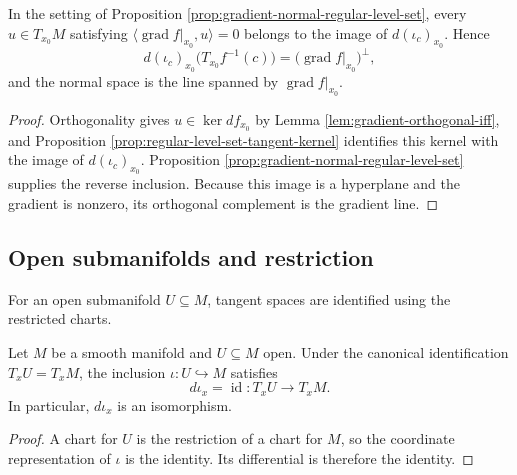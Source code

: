 \begin{proposition}
\label{prop:tangent-space-regular-level-set-gradient-orthogonal}
\leanok
{}
In the setting of Proposition \ref{prop:gradient-normal-regular-level-set}, every
$u\in T_{x_0}M$ satisfying
$\langle\operatorname{grad}f|_{x_0},u\rangle=0$ belongs to the image of
$d(\iota_c)_{x_0}$. Hence
\[
d(\iota_c)_{x_0}\bigl(T_{x_0}f^{-1}(c)\bigr)
=\bigl(\operatorname{grad}f|_{x_0}\bigr)^\perp,
\]
and the normal space is the line spanned by $\operatorname{grad}f|_{x_0}$.
\end{proposition}

\begin{proof}
\leanok
{}
\sketch Orthogonality gives $u\in\ker df_{x_0}$ by
Lemma \ref{lem:gradient-orthogonal-iff}, and Proposition
\ref{prop:regular-level-set-tangent-kernel} identifies this kernel with the image
of $d(\iota_c)_{x_0}$. Proposition
\ref{prop:gradient-normal-regular-level-set} supplies the reverse inclusion.
Because this image is a hyperplane and the gradient is nonzero, its orthogonal
complement is the gradient line.
\end{proof}

\subsection*{Open submanifolds and restriction}

For an open submanifold $U\subseteq M$, tangent spaces are identified using the
restricted charts.

\begin{lemma}
\label{lem:opens-inclusion-differential}
\leanok
Let $M$ be a smooth manifold and $U\subseteq M$ open. Under the canonical
identification $T_xU=T_xM$, the inclusion $\iota\colon U\hookrightarrow M$ satisfies
\[
d\iota_x=\operatorname{id}\colon T_xU\longrightarrow T_xM.
\]
In particular, $d\iota_x$ is an isomorphism.
\end{lemma}

\begin{proof}
\leanok
\sketch A chart for $U$ is the restriction of a chart for $M$, so the coordinate
representation of $\iota$ is the identity. Its differential is therefore the identity.
\end{proof}

